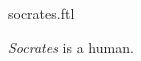 \documentclass{stex}
\begin{document}
\begin{smodule}{socrates.ftl}
  
  \begin{signature}[forthel]
    \emph{Socrates} is a human.
  \end{signature}
\end{smodule}
\end{document}

